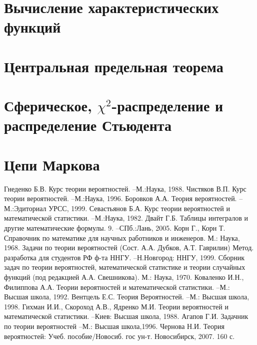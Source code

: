 \documentclass[a4paper,14pt]{extarticle}
\begin{document}
\section{Вычисление характеристических
функций}
\label{par:25}

\section{Центральная предельная теорема} 
\label{par:26}

\section{Сферическое, $\chi^2$-распределение и распределение Стьюдента} 
\label{par:27}

\section{Цепи Маркова} 
\label{par:28}

\newpage
\begin{thebibliography}{12} 
	Гнеденко Б.В. Курс теории вероятностей. --М.:Наука, 1988.
	Чистяков В.П. Курс теории вероятностей. –М.:Наука, 1996.
\bibitem{}
	Боровков А.А. Теория вероятностей. – М.:Эдиториал УРСС, 1999.
	Севастьянов Б.А. Курс теории вероятностей и математической статистики. –М.:Наука, 1982.
	Двайт Г.Б. Таблицы интегралов и другие математические формулы.
	9. –СПб.:Лань, 2005.
	Корн Г., Корн Т. Справочник по математике для научных работников и инженеров. М.: Наука, 1968.
	Задачи по теории вероятностей (Сост. А.А. Дубков, А.Т. Гаврилин) Метод. разработка для студентов РФ ф-та ННГУ. –Н.Новгород: ННГУ, 1999. %
	Сборник задач по теории вероятностей, математической статистике и теории случайных функций (под редакцией А.А. Свешникова). М.: Наука, 1970.
	Коваленко И.Н., Филиппова А.А. Теории вероятностей и математической статистики. –М.: Высшая школа, 1992.
	Вентцель Е.С. Теория Вероятностей. –М.: Высшая школа, 1998.
	Гихман И.И., Скороход А.В., Ядренко М.И. Теории вероятностей и математической статистики. –Киев: Высшая школа, 1988.
	Агапов Г.И. Задачник по теории вероятностей –М.: Высшая школа,1996.
	Чернова Н.И. Теория вероятностей: Учеб. пособие/Новосиб. гос ун-т. Новосибирск, 2007. 160 с.
\end{thebibliography}
\end{document}
